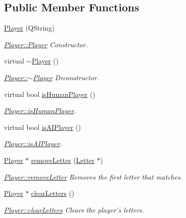\subsection*{Public Member Functions}
\begin{DoxyCompactItemize}
\item 
\hyperlink{class_player_ad079d0b82440f180a6698ff62f1dc1be}{Player} (Q\-String)
\begin{DoxyCompactList}\small\item\em \hyperlink{class_player_ad079d0b82440f180a6698ff62f1dc1be}{Player\-::\-Player} Constructor. \end{DoxyCompactList}\item 
virtual \hyperlink{class_player_a749d2c00e1fe0f5c2746f7505a58c062}{$\sim$\-Player} ()
\begin{DoxyCompactList}\small\item\em \hyperlink{class_player_a749d2c00e1fe0f5c2746f7505a58c062}{Player\-::$\sim$\-Player} Deconstructor. \end{DoxyCompactList}\item 
virtual bool \hyperlink{class_player_adeb8d6fe962f9bf002281f7fe1321cff}{is\-Human\-Player} ()
\begin{DoxyCompactList}\small\item\em \hyperlink{class_player_adeb8d6fe962f9bf002281f7fe1321cff}{Player\-::is\-Human\-Player}. \end{DoxyCompactList}\item 
virtual bool \hyperlink{class_player_afcd43a9498dc70a71ba17484699446bb}{is\-A\-I\-Player} ()
\begin{DoxyCompactList}\small\item\em \hyperlink{class_player_afcd43a9498dc70a71ba17484699446bb}{Player\-::is\-A\-I\-Player}. \end{DoxyCompactList}\item 
\hyperlink{class_player}{Player} $\ast$ \hyperlink{class_player_a720be779010f05b9af198db3e3181369}{remove\-Letter} (\hyperlink{class_letter}{Letter} $\ast$)
\begin{DoxyCompactList}\small\item\em \hyperlink{class_player_a720be779010f05b9af198db3e3181369}{Player\-::remove\-Letter} Removes the first letter that matches. \end{DoxyCompactList}\item 
\hyperlink{class_player}{Player} $\ast$ \hyperlink{class_player_afd0aad702c6ce04bed93c3349f10596f}{clear\-Letters} ()
\begin{DoxyCompactList}\small\item\em \hyperlink{class_player_afd0aad702c6ce04bed93c3349f10596f}{Player\-::clear\-Letters} Clears the player's letters. \end{DoxyCompactList}\item 

\end{DoxyCompactItemize}
